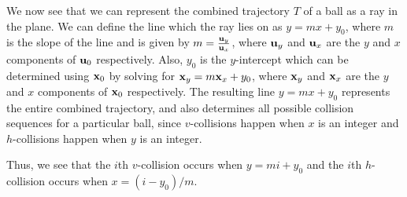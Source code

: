 We now see that we can represent the combined trajectory $T$ of a ball as a ray in the plane. We can define the line which the ray lies on as $y = mx + y_0$, where $m$ is the slope of the line and is given by $m = \frac{\mathbf{u}_y}{\mathbf{u}_x}$, where $\mathbf{u}_y$ and $\mathbf{u}_x$ are the $y$ and $x$ components of $\mathbf{u}_0$ respectively. Also, $y_0$ is the $y$-intercept which can be determined using $\mathbf{x}_0$ by solving for $\mathbf{x}_y = m \mathbf{x}_x + y_0$, where $\mathbf{x}_y$ and $\mathbf{x}_x$ are the $y$ and $x$ components of $\mathbf{x}_0$ respectively. The resulting line $y = mx + y_0$ represents the entire combined trajectory, and also determines all possible collision sequences for a particular ball, since $v$-collisions happen when $x$ is an integer and $h$-collisions happen when $y$ is an integer.

Thus, we see that the $i$th $v$-collision occurs when $y = mi + y_0$ and the $i$th $h$-collision occurs when $x = (i - y_0) / m$.
